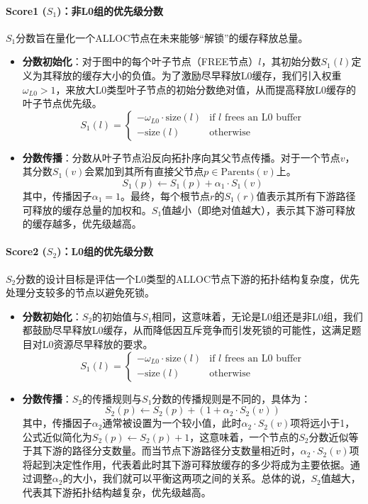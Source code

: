 \paragraph{Score1 ($S_1$)：非L0组的优先级分数}
\quad \quad $S_1$分数旨在量化一个ALLOC节点在未来能够“解锁”的缓存释放总量。
\begin{itemize}[noitemsep]
    \item \textbf{分数初始化}：对于图中的每个叶子节点（FREE节点）$l$，其初始分数$S_1(l)$定义为其释放的缓存大小的负值。为了激励尽早释放L0缓存，我们引入权重$\omega_{L0} > 1$，来放大L0类型叶子节点的初始分数绝对值，从而提高释放L0缓存的叶子节点优先级。
    \[
    S_1(l) = \begin{cases} 
    -\omega_{L0} \cdot \text{size}(l) & \text{if } l \text{ frees an L0 buffer} \\
    -\text{size}(l) & \text{otherwise}
    \end{cases}
    \]
    \item \textbf{分数传播}：分数从叶子节点沿反向拓扑序向其父节点传播。对于一个节点$v$，其分数$S_1(v)$会累加到其所有直接父节点$p \in \text{Parents}(v)$上。
    \[
    S_1(p) \leftarrow S_1(p) + \alpha_1 \cdot S_1(v)
    \]
    其中，传播因子$\alpha_1=1$。最终，每个根节点$r$的$S_1(r)$值表示其所有下游路径可释放的缓存总量的加权和。$S_1$值越小（即绝对值越大），表示其下游可释放的缓存越多，优先级越高。
\end{itemize}

\paragraph{Score2 ($S_2$)：L0组的优先级分数}
\quad \quad $S_2$分数的设计目标是评估一个L0类型的ALLOC节点下游的拓扑结构复杂度，优先处理分支较多的节点以避免死锁。
\begin{itemize}
    \item \textbf{分数初始化}：$S_2$的初始值与$S_1$相同，这意味着，无论是L0组还是非L0组，我们都鼓励尽早释放L0缓存，从而降低因互斥竞争而引发死锁的可能性，这满足题目对L0资源尽早释放的要求。
    \[
    S_1(l) = \begin{cases} 
    -\omega_{L0} \cdot \text{size}(l) & \text{if } l \text{ frees an L0 buffer} \\
    -\text{size}(l) & \text{otherwise}
    \end{cases}
    \]
    \item \textbf{分数传播}：$S_2$的传播规则与$S_1$分数的传播规则是不同的，具体为：
    \[
    S_2(p) \leftarrow S_2(p) + (1 + \alpha_2 \cdot S_2(v))
    \]
    其中，传播因子$\alpha_2$通常被设置为一个较小值，此时$\alpha_2 \cdot S_2(v)$项将远小于1，公式近似简化为$S_2(p) \leftarrow S_2(p) + 1$，这意味着，一个节点的$S_2$分数近似等于其下游的路径分支数量。而当节点下游路径分支数量相近时，$\alpha_2 \cdot S_2(v)$项将起到决定性作用，代表着此时其下游可释放缓存的多少将成为主要依据。通过调整$\alpha_2$的大小，我们就可以平衡这两项之间的关系。总体的说，$S_2$值越大，代表其下游拓扑结构越复杂，优先级越高。
\end{itemize}

